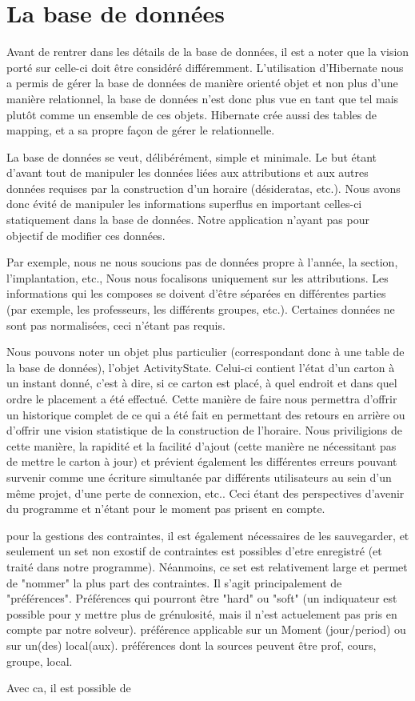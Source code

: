 \chapter{La base de données}

Avant de rentrer dans les détails de la base de données, il est a noter que la vision porté sur celle-ci doit être considéré différemment. L'utilisation d'Hibernate nous a permis de gérer la base de données de manière orienté objet et non plus d'une manière relationnel, la base de données n'est donc plus vue en tant que tel mais plutôt comme un ensemble de ces objets. Hibernate crée aussi des tables de mapping, et a sa propre façon de gérer le relationnelle.

La base de données se veut, délibérément, simple et minimale. Le but étant d'avant tout de manipuler les données liées aux attributions et aux autres données requises par la construction d'un horaire (désideratas, etc.). Nous avons donc évité de manipuler les informations superflus en important celles-ci statiquement dans la base de données. Notre application n'ayant pas pour objectif de modifier ces données.

Par exemple, nous ne nous soucions pas de données propre à l'année, la section, l'implantation, etc.,  Nous nous focalisons uniquement sur les attributions. Les informations qui les composes se doivent d'être séparées en différentes parties (par exemple, les professeurs, les différents groupes, etc.). Certaines données ne sont pas normalisées, ceci n'étant pas requis.

Nous pouvons noter un objet plus particulier (correspondant donc à une table de la base de données), l'objet ActivityState. Celui-ci contient l'état d'un carton à un instant donné, c'est à dire, si ce carton est placé, à quel endroit et dans quel ordre le placement a été effectué.  Cette manière de faire nous permettra d'offrir un historique complet de ce qui a été fait en permettant des retours en arrière ou d'offrir une vision statistique de la construction de l'horaire. Nous priviligions de cette manière,  la rapidité et la facilité d'ajout (cette manière ne nécessitant pas de mettre le carton à jour) et prévient également les différentes erreurs pouvant survenir comme une écriture simultanée par différents utilisateurs au sein d'un même projet, d'une perte de connexion, etc.. Ceci étant des perspectives d'avenir du programme et n'étant pour le moment pas prisent en compte.

pour la gestions des contraintes, il est également nécessaires de les sauvegarder, et seulement un set non exostif de contraintes est possibles d'etre enregistré (et traité dans notre programme). Néanmoins, ce set est relativement large et permet de "nommer" la plus part des contraintes.  Il s'agit principalement de "préférences".  Préférences qui pourront être "hard" ou "soft" (un indiquateur est possible pour y mettre plus de grénulosité, mais il n'est actuelement pas pris en compte par notre solveur).  préférence applicable sur un Moment (jour/period) ou sur un(des) local(aux).  préférences dont la sources peuvent être prof, cours, groupe, local.

Avec ca, il est possible de 


